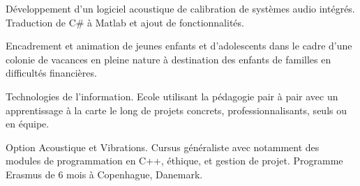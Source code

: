 \documentclass[10pt,a4paper]{altacv}
\begin{document}
D\'eveloppement d'un logiciel acoustique de calibration de syst\`emes audio int\'egr\'es. Traduction de C\# \`a
Matlab et ajout de fonctionnalit\'es.

\divider

Encadrement et animation de jeunes enfants et d'adolescents dans le cadre d'une colonie de vacances en pleine nature \`a destination des enfants de familles en difficult\'es financi\`eres.


Technologies de l'information.\linebreak
Ecole utilisant la p\'edagogie pair \`a pair avec un apprentissage \`a la carte le long de projets concrets, professionnalisants, seuls ou en \'equipe.
\divider

Option Acoustique et Vibrations.\linebreak
Cursus g\'en\'eraliste avec notamment des modules de programmation en C++, \'ethique, et gestion de projet. Programme Erasmus de 6 mois \`a Copenhague, Danemark.

\clearpage
\end{document}
